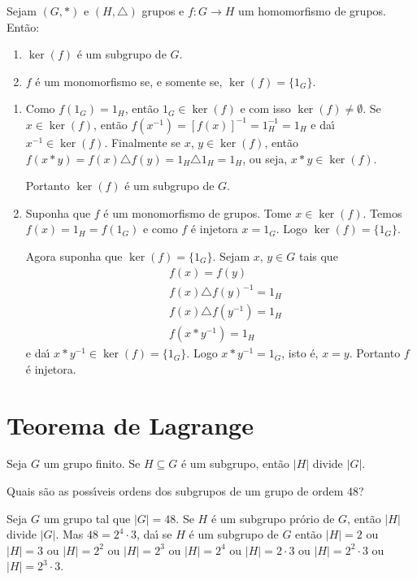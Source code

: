 \begin{proposicao}
	Sejam $(G, *)$ e $(H, \triangle)$ grupos e $f : G \to H$ um homomorfismo de grupos. Ent\~ao:
	\begin{enumerate}[label={\roman*})]
		\item $\ker(f)$ \'e um subgrupo de $G$.
		\item $f$ \'e um monomorfismo se, e somente se, $\ker(f) = \{1_G\}$.
	\end{enumerate}
\end{proposicao}
\begin{prova}
	\begin{enumerate}[label={\roman*})]
		\item Como $f(1_G) = 1_H$, ent\~ao $1_G \in \ker(f)$ e com isso $\ker(f) \ne \emptyset$. Se $x \in \ker(f)$, ent\~ao $f(x^{-1}) = [f(x)]^{-1} = 1_H^{-1} = 1_H$ e da{\'\i} $x^{-1} \in \ker(f)$. Finalmente se $x$, $y \in \ker(f)$, ent\~ao $f(x*y) = f(x)\triangle f(y) = 1_H \triangle 1_H = 1_H$, ou seja, $x * y \in \ker(f)$.

		Portanto $\ker(f)$ \'e um subgrupo de $G$.

		\item Suponha que $f$ \'e um monomorfismo de grupos. Tome $x \in \ker(f)$. Temos $f(x) = 1_H = f(1_G)$ e como $f$ \'e injetora $x = 1_G$. Logo $\ker(f) = \{1_G\}$.

		Agora suponha que $\ker(f) = \{1_G\}$. Sejam $x$, $y \in G$ tais que
		\begin{align*}
			&f(x) = f(y)\\
			&f(x)\triangle f(y)^{-1} = 1_H\\
			&f(x)\triangle f(y^{-1}) = 1_H\\
			&f(x * y^{-1}) = 1_H
		\end{align*}
		e da{\'\i} $x*y^{-1} \in \ker(f) = \{1_G\}$. Logo $x*y^{-1} = 1_G$, isto \'e, $x = y$. Portanto $f$ \'e injetora.
	\end{enumerate}
\end{prova}

\section{Teorema de Lagrange}

\begin{teorema}\label{teorema_de_lagrange}
	Seja $G$ um grupo finito. Se $H\subseteq G$ {\'e} um subgrupo, ent{\~a}o $|H|$ divide $|G|$.
\end{teorema}

\begin{exemplo}
	Quais s{\~a}o as poss{\'\i}veis ordens dos subgrupos de um grupo de ordem 48?
	\begin{solucao}
		Seja $G$ um grupo tal que $|G|=48$. Se $H$ {\'e} um subgrupo pr\'orio de $G$, ent{\~a}o $|H|$ divide $|G|$. Mas $48=2^{4}\cdot 3$, da{\'\i} se $H$ \'e um subgrupo de $G$ ent\~ao $|H|=2$ ou $|H|=3$ ou $|H|= 2^{2}$ ou $|H|=2^{3}$ ou $|H|=2^{4}$ ou $|H|=2\cdot3$ ou $|H|=2^2\cdot 3$ ou $|H|=2^3\cdot 3$.
	\end{solucao}
\end{exemplo}

